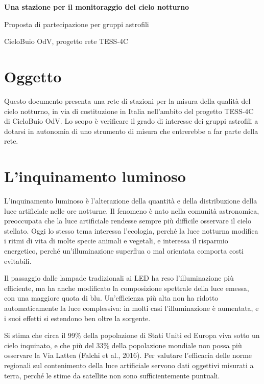 \documentclass[11pt,a4paper]{report}
\begin{document}
\begin{center}

{\LARGE\bfseries\color{nightblue} Una stazione per il monitoraggio del cielo notturno\par}

\vspace{0.2cm}

{\large Proposta di partecipazione per gruppi astrofili\par}

\vspace{0.1cm}

{\small CieloBuio OdV, progetto rete TESS-4C}

\end{center}

\section*{Oggetto}

Questo documento presenta una rete di stazioni per la misura della qualità del cielo notturno, in via di costituzione in Italia nell'ambito del progetto TESS-4C di CieloBuio OdV. Lo scopo è verificare il grado di interesse dei gruppi astrofili a dotarsi in autonomia di uno strumento di misura che entrerebbe a far parte della rete.

\section*{L'inquinamento luminoso}

L'inquinamento luminoso è l'alterazione della quantità e della distribuzione della luce artificiale nelle ore notturne. Il fenomeno è nato nella comunità astronomica, preoccupata che la luce artificiale rendesse sempre più difficile osservare il cielo stellato. Oggi lo stesso tema interessa l'ecologia, perché la luce notturna modifica i ritmi di vita di molte specie animali e vegetali, e interessa il risparmio energetico, perché un'illuminazione superflua o mal orientata comporta costi evitabili.

Il passaggio dalle lampade tradizionali ai LED ha reso l'illuminazione più efficiente, ma ha anche modificato la composizione spettrale della luce emessa, con una maggiore quota di blu. Un'efficienza più alta non ha ridotto automaticamente la luce complessiva: in molti casi l'illuminazione è aumentata, e i suoi effetti si estendono ben oltre la sorgente.

Si stima che circa il 99\% della popolazione di Stati Uniti ed Europa viva sotto un cielo inquinato, e che più del 33\% della popolazione mondiale non possa più osservare la Via Lattea (Falchi et al., 2016). Per valutare l'efficacia delle norme regionali sul contenimento della luce artificiale servono dati oggettivi misurati a terra, perché le stime da satellite non sono sufficientemente puntuali.
\end{document}
